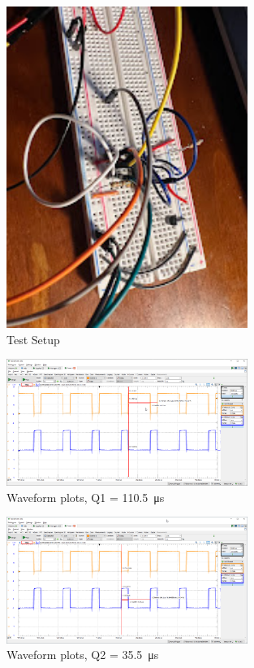\documentclass{article}
\begin{document}
	\begin{figure}[H]
	    \centering
	    \includegraphics[width=0.7\textwidth]{3c-setup}
	    \caption{Test Setup}
	\end{figure}
	
	\begin{figure}[H]
	    \centering
	    \includegraphics[width=0.7\textwidth]{3c-2}
	    \caption{Waveform plots, Q1 = \SI{110.5}{\micro\second}}
	\end{figure}
	
	\begin{figure}[H]
	    \centering
	    \includegraphics[width=0.7\textwidth]{3c}
	    \caption{Waveform plots, Q2 = \SI{35.5}{\micro\second}}
	\end{figure}
	
\end{document}
